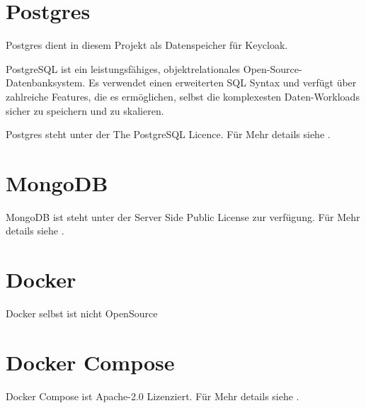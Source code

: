 \section{Postgres}

Postgres dient in diesem Projekt als Datenspeicher für Keycloak.

PostgreSQL ist ein leistungsfähiges, objektrelationales Open-Source-Datenbanksystem.
Es verwendet einen erweiterten SQL Syntax und verfügt über zahlreiche Features,
die es ermöglichen, selbst die komplexesten Daten-Workloads sicher zu speichern und zu skalieren.
\cite{about-postgres}

Postgres steht unter der The PostgreSQL Licence.
Für Mehr details siehe .


\section{MongoDB}

MongoDB ist steht unter der Server Side Public License zur verfügung.
Für Mehr details siehe .

\section{Docker}

Docker selbst ist nicht OpenSource

\section{Docker Compose}

Docker Compose ist Apache-2.0 Lizenziert.
Für Mehr details siehe .
